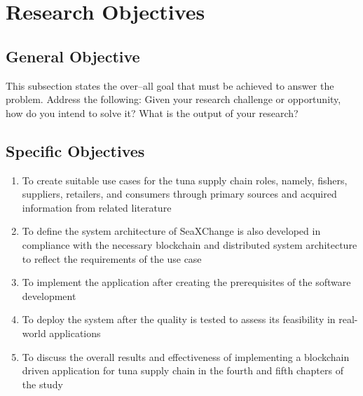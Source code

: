 \section{Research Objectives}
\label{sec:researchobjectives}

\subsection{General Objective}
\label{sec:generalobjective}

This subsection states the over--all goal that must be achieved to answer the problem.
Address the following: Given your research challenge or opportunity, how do you intend  to solve it? What is the output of your research?


\subsection{Specific Objectives}
\label{sec:specificobjectives}

%
%


\begin{enumerate}
	
	\item To create suitable use cases for the tuna supply chain roles, namely, fishers, suppliers, retailers, and consumers through primary sources and acquired information from related literature
	\item To define the system architecture of SeaXChange is also developed in compliance with the necessary blockchain and distributed system architecture to reflect the requirements of the use case
	\item To implement the application after creating the prerequisites of the software development  
	\item To deploy the system after the quality is tested to assess its feasibility in real-world applications 
	\item To discuss the overall results and effectiveness of implementing a blockchain driven application for tuna supply chain in the fourth and fifth chapters of the study
\end{enumerate}


